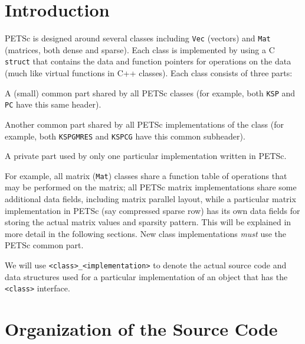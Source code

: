 \section{Introduction}

PETSc is designed around several classes including \lstinline{Vec} (vectors) and
\lstinline{Mat} (matrices, both dense and sparse). Each class is
implemented by using a C \lstinline{struct} that contains the data and function pointers
for operations on the data (much like virtual functions in C++ classes).
Each class consists of three parts:
\begin{tightenumerate}
  \item A (small) common part shared by all PETSc classes (for example, both \lstinline{KSP} and \lstinline{PC} have this same header).
  \item Another common part shared by all PETSc implementations of the class (for example, both \lstinline{KSPGMRES} and \lstinline{KSPCG} have this common subheader).
  \item A private part used by only one particular implementation written in PETSc.
\end{tightenumerate}
For example, all matrix (\lstinline{Mat}) classes share a function table of operations that
may be performed on the matrix; all PETSc matrix implementations share some additional
data fields, including matrix parallel layout, while a particular matrix implementation in PETSc
(say compressed sparse row) has its own data fields for storing the actual
matrix values and sparsity pattern. This will be explained in more detail
in the following sections. New class implementations {\em must}
use the PETSc common part.


We will use \lstinline{<class>_<implementation>} to denote the actual source code and
data structures used for a particular implementation of an object that has the
\lstinline{<class>} interface.

\section{Organization of the Source Code}

